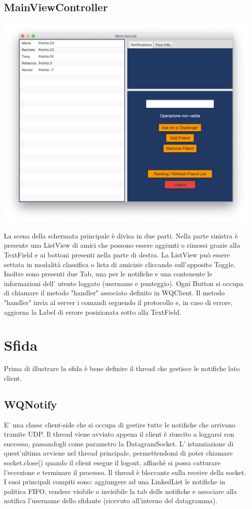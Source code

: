\documentclass{article}
\begin{document}
\subsection{MainViewController}
\begin{center}
\includegraphics[scale=0.5]{quizzlemain.png}
\end{center}
La scena della schermata principale è divisa in due parti. Nella parte sinistra è presente una ListView di amici che possono essere aggiunti o rimossi grazie alla TextField e ai bottoni presenti nella parte di destra. La ListView può essere settata in modalità classifica o lista di amicizie cliccando sull'apposito Toggle. Inoltre sono presenti due Tab, una per le notifiche e una contenente le informazioni dell' utente loggato (username e punteggio).
Ogni Button si occupa di chiamare il metodo "handler" associato definito in WQClient. Il metodo "handler" invia al server i comandi seguendo il protocollo e, in caso di errore, aggiorna la Label di errore posizionata sotto alla TextField.
\clearpage

\section{Sfida}
Prima di illustrare la sfida è bene definire il thread che gestisce le notifiche lato client.

\subsection{WQNotify}
E' una classe client-side che si occupa di gestire tutte le notifiche che arrivano tramite UDP. Il thread viene avviato appena il client è riuscito a loggarsi con successo, passandogli come parametro la DatagramSocket. L' istanziazione di quest'ultima avviene nel thread principale, permettendomi di poter chiamare socket.close() quando il client esegue il logout, affinchè si possa catturare l'eccezione e terminare il processo. Il thread è bloccante sulla receive della socket. I suoi principali compiti sono: aggiungere ad una LinkedList le notifiche in politica FIFO, rendere visibile o invisibile la tab delle notifiche e associare alla notifica l'username dello sfidante (ricevuto all'interno del datagramma).
\end{document}
